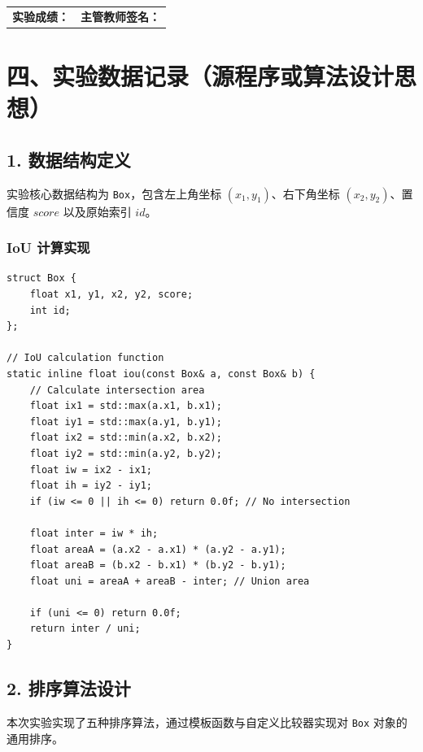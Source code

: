 \documentclass[a4paper,12pt]{ctexart}
\begin{document}
\vspace{2cm}

\noindent
\begin{tabular}{p{}p{}}
    \textbf{实验成绩：} \underline{\hspace{4cm}} & \textbf{主管教师签名：} \underline{\hspace{4cm}} \\
\end{tabular}

\newpage

\section*{四、实验数据记录（源程序或算法设计思想）}

\subsection{1. 数据结构定义}

实验核心数据结构为 \texttt{Box}，包含左上角坐标 $(x_1, y_1)$、右下角坐标 $(x_2, y_2)$、置信度 $score$ 以及原始索引 $id$。

\subsubsection{IoU 计算实现}
\begin{lstlisting}
struct Box {
    float x1, y1, x2, y2, score;
    int id;
};

// IoU calculation function
static inline float iou(const Box& a, const Box& b) {
    // Calculate intersection area
    float ix1 = std::max(a.x1, b.x1);
    float iy1 = std::max(a.y1, b.y1);
    float ix2 = std::min(a.x2, b.x2);
    float iy2 = std::min(a.y2, b.y2);
    float iw = ix2 - ix1;
    float ih = iy2 - iy1;
    if (iw <= 0 || ih <= 0) return 0.0f; // No intersection
    
    float inter = iw * ih;
    float areaA = (a.x2 - a.x1) * (a.y2 - a.y1);
    float areaB = (b.x2 - b.x1) * (b.y2 - b.y1);
    float uni = areaA + areaB - inter; // Union area
    
    if (uni <= 0) return 0.0f;
    return inter / uni;
}
\end{lstlisting}
\subsection{2. 排序算法设计}

本次实验实现了五种排序算法，通过模板函数与自定义比较器实现对 \texttt{Box} 对象的通用排序。
\end{document}
